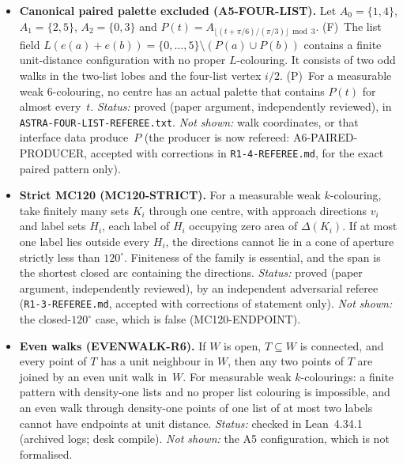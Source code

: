 \documentclass[11pt]{article}
\theoremstyle{definition}
\theoremstyle{remark}
\begin{document}
\begin{itemize}
\item \textbf{Canonical paired palette excluded (A5-FOUR-LIST).}
Let $A_0=\{1,4\}$, $A_1=\{2,5\}$, $A_2=\{0,3\}$ and
$P(t)=A_{\lfloor (t+\pi/6)/(\pi/3)\rfloor \bmod 3}$.
(F)~The list field $L(e(a)+e(b))=\{0,\dots,5\}\setminus(P(a)\cup P(b))$
contains a finite unit-distance configuration with no proper $L$-colouring.
It consists of two odd walks in the two-list lobes and the four-list vertex
$i/2$.
(P)~For a measurable weak 6-colouring, no centre has an actual palette that
contains $P(t)$ for almost every~$t$.
\emph{Status:} proved (paper argument, independently reviewed), in
\texttt{ASTRA-\allowbreak{}FOUR-\allowbreak{}LIST-\allowbreak{}REFEREE.\allowbreak{}txt}.
\emph{Not shown:} walk coordinates, or that interface data produce~$P$ (the producer is now refereed: A6-PAIRED-PRODUCER, accepted with corrections in \texttt{R1-4-REFEREE.md}, for the exact paired pattern only).

\item \textbf{Strict MC120 (MC120-STRICT).} For a measurable weak $k$-colouring, take finitely many sets $K_i$ through one centre, with approach directions $v_i$ and label sets $H_i$, each label of $H_i$ occupying zero area of $\Delta(K_i)$. If at most one label lies outside every $H_i$, the directions cannot lie in a cone of aperture strictly less than $120^\circ$. Finiteness of the family is essential, and the span is the shortest closed arc containing the directions. \emph{Status:} proved (paper argument, independently reviewed), by an independent adversarial referee (\texttt{R1-3-REFEREE.md}, accepted with corrections of statement only). \emph{Not shown:} the closed-$120^\circ$ case, which is false (MC120-ENDPOINT).

\item \textbf{Even walks (EVENWALK-R6).}
If $W$ is open, $T\subseteq W$ is connected, and every point of $T$ has a unit
neighbour in $W$, then any two points of $T$ are joined by an even unit walk
in~$W$. For measurable weak $k$-colourings: a finite pattern with density-one
lists and no proper list colouring is impossible, and an even walk through
density-one points of one list of at most two labels cannot have endpoints at
unit distance.
\emph{Status:} checked in Lean~4.34.1 (archived logs; desk compile).
\emph{Not shown:} the A5 configuration, which is not formalised.


\end{itemize}
\end{document}
